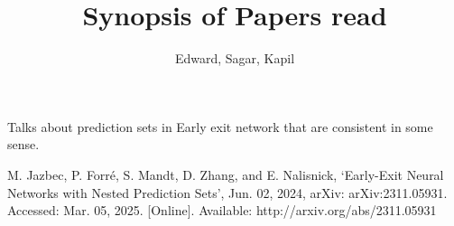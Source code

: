 \documentclass{article}
\begin{document}
\title{Synopsis of Papers read}
\author{Edward, Sagar, Kapil}
\maketitle

\cite{MJaz+24} Talks about prediction sets in Early exit network that are consistent in some sense.






\begin{thebibliography}{99}
    M. Jazbec, P. Forré, S. Mandt, D. Zhang, and E. Nalisnick, 
    ‘Early-Exit Neural Networks with Nested Prediction Sets’, Jun. 02, 2024, 
    arXiv: arXiv:2311.05931. Accessed: Mar. 05, 2025. [Online]. Available: http://arxiv.org/abs/2311.05931
\end{thebibliography}
\end{document}
